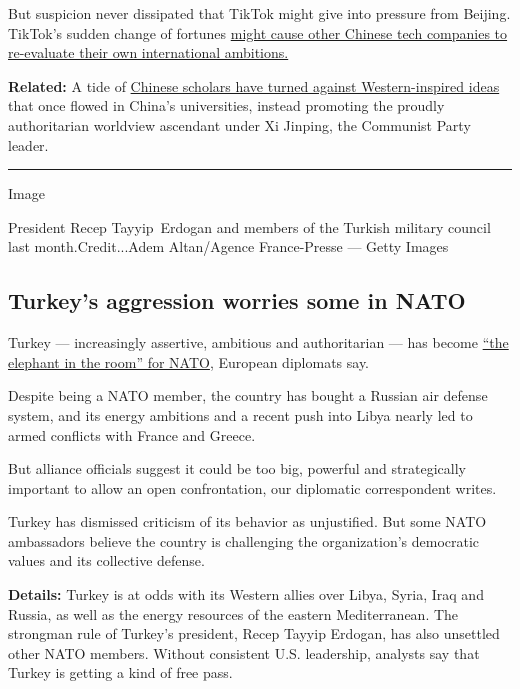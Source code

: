 But suspicion never dissipated that TikTok might give into pressure from
Beijing. TikTok's sudden change of fortunes
\href{https://www.nytimes3xbfgragh.onion/2020/08/03/technology/tiktok-bytedance-us-china.html}{might
cause other Chinese tech companies to re-evaluate their own
international ambitions.}

\textbf{Related:} A tide of
\href{https://www.nytimes3xbfgragh.onion/2020/08/02/world/asia/china-hong-kong-national-security-law.html}{Chinese
scholars have turned against Western-inspired ideas} that once flowed in
China's universities, instead promoting the proudly authoritarian
worldview ascendant under Xi Jinping, the Communist Party leader.

\begin{center}\rule{0.5\linewidth}{\linethickness}\end{center}

Image

President Recep Tayyip~Erdogan and members of the Turkish military
council last month.Credit...Adem Altan/Agence France-Presse --- Getty
Images

\hypertarget{turkeys-aggression-worries-some-in-nato}{%
\subsection{Turkey's aggression worries some in
NATO}\label{turkeys-aggression-worries-some-in-nato}}

Turkey --- increasingly assertive, ambitious and authoritarian --- has
become
\href{https://www.nytimes3xbfgragh.onion/2020/08/03/world/europe/turkey-nato.html}{``the
elephant in the room'' for NATO}, European diplomats say.

Despite being a NATO member, the country has bought a Russian air
defense system, and its energy ambitions and a recent push into Libya
nearly led to armed conflicts with France and Greece.

But alliance officials suggest it could be too big, powerful and
strategically important to allow an open confrontation, our diplomatic
correspondent writes.

Turkey has dismissed criticism of its behavior as unjustified. But some
NATO ambassadors believe the country is challenging the organization's
democratic values and its collective defense.

\textbf{Details:} Turkey is at odds with its Western allies over Libya,
Syria, Iraq and Russia, as well as the energy resources of the eastern
Mediterranean. The strongman rule of Turkey's president, Recep Tayyip
Erdogan, has also unsettled other NATO members. Without consistent U.S.
leadership, analysts say that Turkey is getting a kind of free pass.

